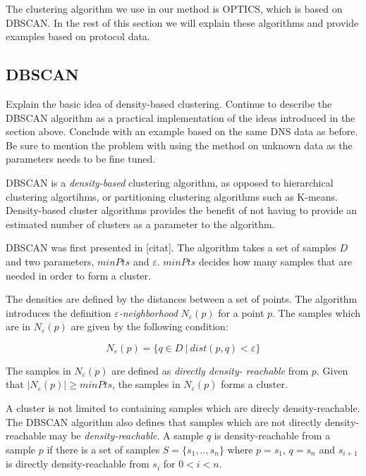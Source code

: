 \documentclass[a4paper]{report}
\begin{document}
The clustering algorithm we use in our method is OPTICS, which is based on
DBSCAN. In the rest of this section we will explain these algorithms and
provide examples based on protocol data.

\subsection{DBSCAN}
Explain the basic idea of density-based clustering. Continue to describe the
DBSCAN algorithm as a practical implementation of the ideas introduced in the
section above. Conclude with an example based on the same DNS data as before.
Be sure to mention the problem with using the method on unknown data as the
parameters needs to be fine tuned.

DBSCAN is a \emph{density-based} clustering algorithm, as opposed to
hierarchical clustering algortihms, or partitioning clustering algorithms such
as K-means. Density-based cluster algorithms provides the benefit of not
having to provide an estimated number of clusters as a parameter to the
algorithm.

DBSCAN was first presented in [citat]. The algorithm takes a set of samples
$D$ and two parameters, $minPts$ and $\varepsilon$. $minPts$ decides how many
samples that are needed in order to form a cluster.

The densities are defined by the distances between a set of points.
The algorithm introduces the definition \emph{$\varepsilon$-neighborhood}
$N_{\varepsilon}(p)$ for a point $p$. The samples which are in 
$N_{\varepsilon}(p)$ are given by the following condition:

\begin{equation}
    N_{\varepsilon}(p) = \{ q \in D ~|~ dist(p,q) < \varepsilon  \}
    \label{eq:eps}
\end{equation}

The samples in $N_{\varepsilon}(p)$ are defined as \emph{directly density-
reachable} from $p$. Given that $|N_{\varepsilon}(p)| \ge minPts$, the samples in
$N_{\varepsilon}(p)$ forms a cluster. 

A cluster is not limited to containing samples which are direcly
density-reachable. The DBSCAN algorithm also defines that samples which are
not directly density-reachable may be \emph{density-reachable}.
A sample $q$ is density-reachable from a sample $p$ if there is a set of samples
$S = \{s_1, .., s_n\}$ where $p = s_1$, $q = s_n$ and $s_{i+1}$ is directly
density-reachable from $s_i$ for $0 < i < n$.
\end{document}

